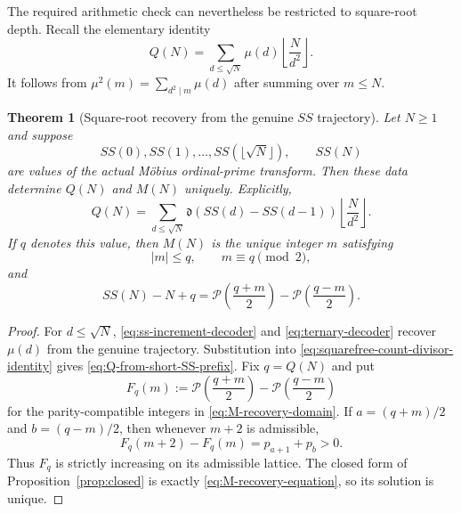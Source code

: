 \documentclass[11pt]{amsart}
\numberwithin{equation}{section}
\theoremstyle{plain}
\newtheorem{theorem}{Theorem}[section]
\theoremstyle{definition}
\theoremstyle{remark}
\begin{document}
The required arithmetic check can nevertheless be restricted to square-root
depth.  Recall the elementary identity
\begin{equation}
\label{eq:squarefree-count-divisor-identity}
Q(N)=\sum_{d\le\sqrt N}\mu(d)\left\lfloor\frac{N}{d^2}\right\rfloor.
\end{equation}
It follows from $\mu^2(m)=\sum_{d^2\mid m}\mu(d)$ after summing over $m\le N$.

\begin{theorem}[Square-root recovery from the genuine $SS$ trajectory]
\label{thm:sqrt-recovery}
Let $N\ge1$ and suppose
\begin{equation}
\label{eq:sqrt-recovery-data}
SS(0),SS(1),\ldots,SS(\lfloor\sqrt N\rfloor),\qquad SS(N)
\end{equation}
are values of the actual M\"obius ordinal-prime transform.  Then these data
determine $Q(N)$ and $M(N)$ uniquely.  Explicitly,
\begin{equation}
\label{eq:Q-from-short-SS-prefix}
\boxed{\;
Q(N)=\sum_{d\le\sqrt N}
\mathfrak d\!\left(SS(d)-SS(d-1)\right)
\left\lfloor\frac{N}{d^2}\right\rfloor .\;}
\end{equation}
If $q$ denotes this value, then $M(N)$ is the unique integer $m$ satisfying
\begin{equation}
\label{eq:M-recovery-domain}
|m|\le q,\qquad m\equiv q\pmod2,
\end{equation}
and
\begin{equation}
\label{eq:M-recovery-equation}
SS(N)-N+q=
\mathcal P\!\left(\frac{q+m}{2}\right)
-\mathcal P\!\left(\frac{q-m}{2}\right).
\end{equation}
\end{theorem}

\begin{proof}
For $d\le\sqrt N$, \eqref{eq:ss-increment-decoder} and
\eqref{eq:ternary-decoder} recover $\mu(d)$ from the genuine trajectory.
Substitution into \eqref{eq:squarefree-count-divisor-identity} gives
\eqref{eq:Q-from-short-SS-prefix}.  Fix $q=Q(N)$ and put
\begin{equation}
\label{eq:Fq-definition}
F_q(m):=
\mathcal P\!\left(\frac{q+m}{2}\right)
-\mathcal P\!\left(\frac{q-m}{2}\right)
\end{equation}
for the parity-compatible integers in \eqref{eq:M-recovery-domain}.  If
$a=(q+m)/2$ and $b=(q-m)/2$, then whenever $m+2$ is admissible,
\begin{equation}
\label{eq:Fq-strict-increment}
F_q(m+2)-F_q(m)=p_{a+1}+p_b>0.
\end{equation}
Thus $F_q$ is strictly increasing on its admissible lattice.  The closed form
of Proposition~\ref{prop:closed} is exactly
\eqref{eq:M-recovery-equation}, so its solution is unique.
\end{proof}
\end{document}
